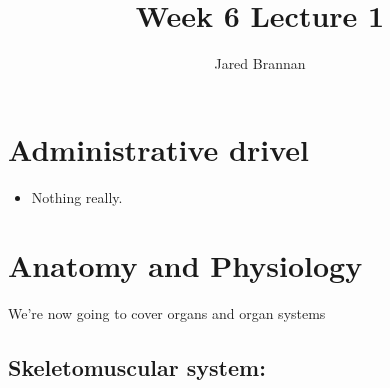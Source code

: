 \documentclass{article}
\title{Week 6 Lecture 1}
\author{Jared Brannan }
\theoremstyle{definition}
\begin{document}
\maketitle

\section{Administrative drivel}
\begin{itemize}
	\item Nothing really.
\end{itemize}

\section{Anatomy and Physiology}
We're now going to cover organs and organ systems
	
\subsection{Skeletomuscular system:}
\end{document}
